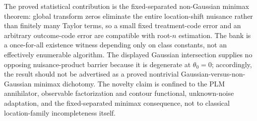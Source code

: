 The proved statistical contribution is the fixed-separated non-Gaussian minimax theorem: global transform zeros eliminate the entire location-shift nuisance rather than finitely many Taylor terms, so a small fixed treatment-code error and an arbitrary outcome-code error are compatible with root-\(n\) estimation. The bank is a once-for-all existence witness depending only on class constants, not an effectively enumerable algorithm. The displayed Gaussian intersection supplies no opposing nuisance-product barrier because it is degenerate at \(\theta_0=0\); accordingly, the result should not be advertised as a proved nontrivial Gaussian-versus-non-Gaussian minimax dichotomy. The novelty claim is confined to the PLM annihilator, observable factorization and contour functional, unknown-noise adaptation, and the fixed-separated minimax consequence, not to classical location-family incompleteness itself.